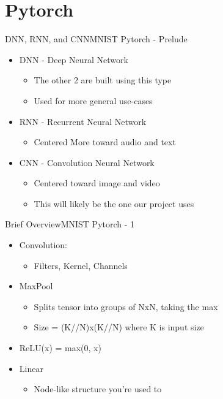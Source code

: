 \documentclass{beamer}
\begin{document}
\section{Pytorch}
\begin{frame}{DNN, RNN, and CNN}{MNIST Pytorch - Prelude}
\begin{itemize}
    \item DNN - Deep Neural Network 
    \begin{itemize}
        \item The other 2 are built using this type
        \item Used for more general use-cases
    \end{itemize}
        
    \item RNN - Recurrent Neural Network 
    \begin{itemize}
        \item Centered More toward audio and text
    \end{itemize}
        
    \item CNN - Convolution Neural Network 
    \begin{itemize}
        \item Centered toward image and video 
        \item This will likely be the one our project uses
    \end{itemize}
\end{itemize}
\end{frame}

\begin{frame}{Brief Overview}{MNIST Pytorch - 1}
\begin{itemize}
    \item Convolution: 
    \begin{itemize}
        \item Filters, Kernel, Channels
    \end{itemize}
    \item MaxPool
    \begin{itemize}
        \item Splits tensor into groups of NxN, taking the max
		\item Size = (K//N)x(K//N) where K is input size 
    \end{itemize}
    \item ReLU(x) = max(0, x)
	\item Linear
    \begin{itemize}
        \item Node-like structure you’re used to
    \end{itemize}
\end{itemize}
\end{frame}
\end{document}

